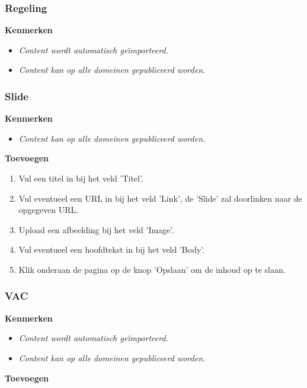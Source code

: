 \subsubsection{Regeling}\label{regeling}

\textbf{Kenmerken}

\begin{itemize}
\item \emph{Content wordt automatisch ge{\"\i}mporteerd.}
\item \emph{Content kan op alle domeinen gepubliceerd worden.}
\end{itemize}

\subsubsection{Slide}\label{slide}

\textbf{Kenmerken}

\begin{itemize}
\item \emph{Content kan op alle domeinen gepubliceerd worden.}
\end{itemize}

\textbf{Toevoegen}

\begin{enumerate}
\item Vul een titel in bij het veld 'Titel'.
\item Vul eventueel een URL in bij het veld 'Link', de 'Slide' zal doorlinken naar de opgegeven URL.
\item Upload een afbeelding bij het veld 'Image'.
\item Vul eventueel een hoofdtekst in bij het veld 'Body'.
\item Klik onderaan de pagina op de knop 'Opslaan' om de inhoud op te slaan.
\end{enumerate}

\subsubsection{VAC}\label{vac}

\textbf{Kenmerken}

\begin{itemize}
\item \emph{Content wordt automatisch ge{\"\i}mporteerd.}
\item \emph{Content kan op alle domeinen gepubliceerd worden.}
\end{itemize}

\textbf{Toevoegen}

